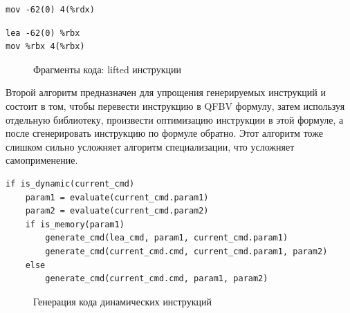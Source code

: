 \newsavebox\boxfive
\begin{lrbox}{\boxfive}
\begin{lstlisting}[xleftmargin = 20pt]
mov -62(0) 4(%rdx)
\end{lstlisting}
\end{lrbox}

\newsavebox\boxsix
\begin{lrbox}{\boxsix}
\begin{lstlisting}[xleftmargin = 20pt]
lea -62(0) %rbx 
mov %rbx 4(%rbx)
\end{lstlisting}
\end{lrbox}

\begin{figure}[!t]
\subfloat[\label{fig:qfbv1}]{\usebox\boxfour}
\hfill
\subfloat[\label{fig:qfbv22}]{\usebox\boxfive}
\hfill
\subfloat[\label{fig:qfbv3}]{\usebox\boxsix}
\caption{Фрагменты кода: lifted инструкции}
\end{figure}

Второй алгоритм предназначен для упрощения генерируемых инструкций и состоит в том, чтобы перевести инструкцию в QFBV формулу, затем используя отдельную библиотеку, произвести оптимизацию инструкции в этой формуле, а после сгенерировать инструкцию по формуле обратно. Этот алгоритм тоже слишком сильно усложняет алгоритм специализации, что усложняет самоприменение.

\newsavebox\boxminustwo
\begin{lrbox}{\boxminustwo}
\begin{lstlisting}[xleftmargin = 20pt]
if is_dynamic(current_cmd)
    param1 = evaluate(current_cmd.param1)
    param2 = evaluate(current_cmd.param2)
    if is_memory(param1)
        generate_cmd(lea_cmd, param1, current_cmd.param1)
        generate_cmd(current_cmd.cmd, current_cmd.param1, param2)
    else 
        generate_cmd(current_cmd.cmd, param1, param2)
\end{lstlisting}
\end{lrbox}
\begin{figure}[!t]
\centering
\subfloat{\usebox\boxminustwo}
\caption{Генерация кода динамических инструкций\label{fig:generate}}
\end{figure}

